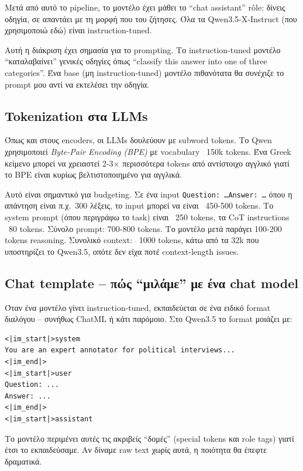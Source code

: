 \documentclass[12pt]{fphw}
\begin{document}
Μετά από αυτό το pipeline, το μοντέλο έχει μάθει το ``chat assistant'' rôle: δίνεις οδηγία, σε απαντάει με τη μορφή που του ζήτησες. Όλα τα Qwen3.5-X-Instruct (που χρησιμοποιώ εδώ) είναι instruction-tuned.

Αυτή η διάκριση έχει σημασία για το prompting. Το instruction-tuned μοντέλο ``καταλαβαίνει'' γενικές οδηγίες όπως ``classify this answer into one of three categories''. Ένα base (μη instruction-tuned) μοντέλο πιθανότατα θα συνέχιζε το prompt μου αντί να εκτελέσει την οδηγία.

\subsection{Tokenization στα LLMs}

Όπως και στους encoders, οι LLMs δουλεύουν με subword tokens. Το Qwen χρησιμοποιεί \emph{Byte-Pair Encoding (BPE)} με vocabulary ~150k tokens. Ένα Greek κείμενο μπορεί να χρειαστεί 2-3× περισσότερα tokens από αντίστοιχο αγγλικό γιατί το BPE είναι κυρίως βελτιστοποιημένο για αγγλικά.

Αυτό είναι σημαντικό για budgeting. Σε ένα input \texttt{Question: \dots Answer: \dots} όπου η απάντηση είναι π.χ.\ 300 λέξεις, το input μπορεί να είναι ~450-500 tokens. Το system prompt (όπου περιγράφω το task) είναι ~250 tokens, τα CoT instructions ~80 tokens. Σύνολο prompt: 700-800 tokens. Το μοντέλο μετά παράγει 100-200 tokens reasoning. Συνολικό context: ~1000 tokens, κάτω από τα 32k που υποστηρίζει το Qwen3.5, οπότε δεν είχα ποτέ context-length issues.

\subsection{Chat template -- πώς ``μιλάμε'' με ένα chat model}

Όταν ένα μοντέλο γίνει instruction-tuned, εκπαιδεύεται σε ένα ειδικό format διαλόγου -- συνήθως ChatML ή κάτι παρόμοιο. Στο Qwen3.5 το format μοιάζει με:

\begin{verbatim}
<|im_start|>system
You are an expert annotator for political interviews...
<|im_end|>
<|im_start|>user
Question: ...
Answer: ...
<|im_end|>
<|im_start|>assistant
\end{verbatim}

Το μοντέλο περιμένει αυτές τις ακριβείς ``δομές'' (special tokens και role tags) γιατί έτσι το εκπαιδεύσαμε. Αν δίναμε raw text χωρίς αυτά, η ποιότητα θα έπεφτε δραματικά.
\end{document}
